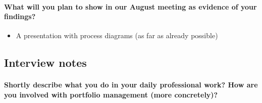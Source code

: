 \paragraph{What will you plan to show in our August meeting as evidence of your findings?}
\begin{itemize}
  \item A presentation with process diagrams (as far as already possible)
\end{itemize}




\subsection{Interview notes}

\paragraph{Shortly describe what you do in your daily professional work? How are you involved with portfolio management (more concretely)?}
